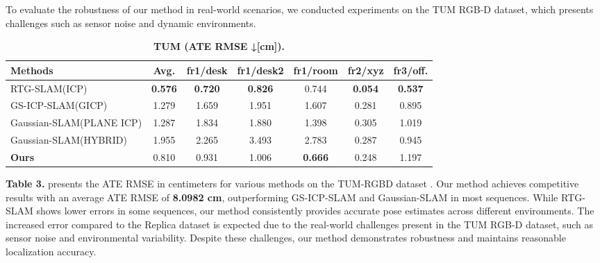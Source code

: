 \documentclass[twocolumn]{article} %
\begin{document}
To evaluate the robustness of our method in real-world scenarios, we
conducted experiments on the TUM RGB-D dataset, which presents
challenges such as sensor noise and dynamic environments.

\begin{table}[htbp]
\renewcommand{\thetable}{\textbf{\arabic{table}}}
\renewcommand{\tablename}{\textbf{Table}}
\centering
\caption{\textbf{TUM\cite{sturmBenchmarkEvaluationRGBD2012} (ATE RMSE ↓[cm]).}}
\label{table:tum_ATE}
\begin{adjustbox}{max width=\columnwidth,max height=!,center}
\begin{tabular}{lcccccc}
\toprule
\textbf{Methods} & \textbf{Avg.} & \textbf{fr1/desk} & \textbf{fr1/desk2} & \textbf{fr1/room} & \textbf{fr2/xyz} & \textbf{fr3/off.}\\
\midrule
RTG-SLAM(ICP)\cite{pengRTGSLAMRealtime3D2024} & \cellcolor{green!30}\textbf{0.576} & \cellcolor{green!30}\textbf{0.720} & \cellcolor{green!30}\textbf{0.826} & \cellcolor{yellow!30}0.744 & \cellcolor{green!30}\textbf{0.054} & \cellcolor{green!30}\textbf{0.537}\\
GS-ICP-SLAM(GICP)\cite{haRGBDGSICPSLAM2024} & \cellcolor{lime!50}1.279 & \cellcolor{lime!50}1.659 & 1.951 & 1.607 & \cellcolor{lime!50}0.281 & \cellcolor{yellow!30}0.895\\
Gaussian-SLAM(PLANE ICP)\cite{yugayGaussianSLAMPhotorealisticDense2024} & 1.287 & 1.834 & \cellcolor{lime!50}1.880 & \cellcolor{lime!50}1.398 & 0.305 & 1.019\\
Gaussian-SLAM(HYBRID)\cite{yugayGaussianSLAMPhotorealisticDense2024} & 1.955 & 2.265 & 3.493 & 2.783 & 0.287 & \cellcolor{lime!50}0.945\\
\midrule
\textbf{Ours} & \cellcolor{yellow!30}0.810 & \cellcolor{yellow!30}0.931 & \cellcolor{yellow!30}1.006 & \cellcolor{green!30}\textbf{0.666} & \cellcolor{yellow!30}0.248 & 1.197\\
\bottomrule
\end{tabular}
\end{adjustbox}
\end{table}

\textbf{Table 3.} presents the ATE RMSE in centimeters for various
methods on the TUM-RGBD dataset
\cite{sturmBenchmarkEvaluationRGBD2012}. Our method achieves
competitive results with an average ATE RMSE of \textbf{8.0982 cm},
outperforming GS-ICP-SLAM\cite{haRGBDGSICPSLAM2024} and
Gaussian-SLAM\cite{yugayGaussianSLAMPhotorealisticDense2024} in most
sequences. While RTG-SLAM\cite{pengRTGSLAMRealtime3D2024} shows
lower errors in some sequences, our method consistently provides
accurate pose estimates across different environments. The increased
error compared to the Replica dataset is expected due to the real-world
challenges present in the TUM RGB-D dataset, such as sensor noise and
environmental variability. Despite these challenges, our method
demonstrates robustness and maintains reasonable localization accuracy.
\end{document}
